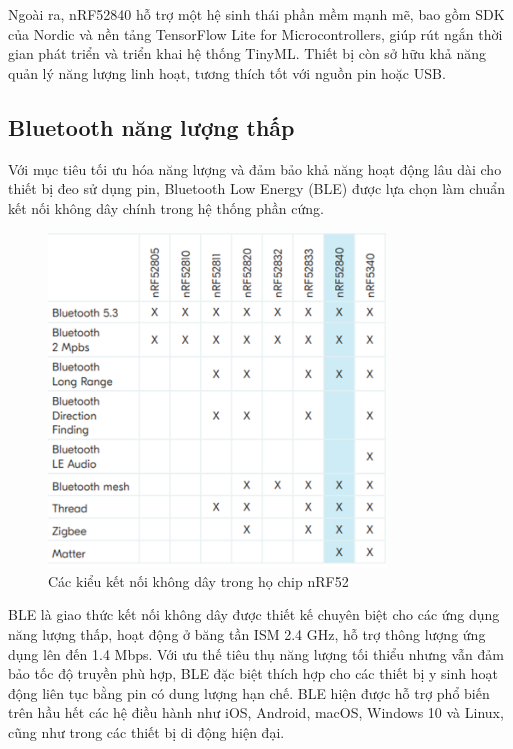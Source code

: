 Ngoài ra, nRF52840 hỗ trợ một hệ sinh thái phần mềm mạnh mẽ, bao gồm SDK 
của Nordic và nền tảng TensorFlow Lite for Microcontrollers, giúp rút 
ngắn thời gian phát triển và triển khai hệ thống TinyML. Thiết bị còn 
sở hữu khả năng quản lý năng lượng linh hoạt, tương thích tốt với nguồn pin hoặc USB. 





\subsection{Bluetooth năng lượng thấp}

Với mục tiêu tối ưu hóa năng lượng và đảm bảo khả năng hoạt động lâu dài 
cho thiết bị đeo sử dụng pin, Bluetooth Low Energy (BLE) được lựa chọn 
làm chuẩn kết nối không dây chính trong hệ thống phần cứng.

\begin{figure}[htbp]
		\centering
 		\includegraphics[width=0.8\textwidth]{images/ble.png}
		\caption{Các kiểu kết nối không dây trong họ chip nRF52}
		\label{ble}
\end{figure}

BLE là giao thức kết nối không dây được thiết kế chuyên biệt cho 
các ứng dụng năng lượng thấp, hoạt động ở băng tần ISM 2.4 GHz, 
hỗ trợ thông lượng ứng dụng lên đến 1.4 Mbps. Với ưu thế tiêu thụ năng 
lượng tối thiểu nhưng vẫn đảm bảo tốc độ truyền phù hợp, BLE đặc biệt 
thích hợp cho các thiết bị y sinh hoạt động liên tục bằng pin có dung 
lượng hạn chế. BLE hiện được hỗ trợ phổ biến trên hầu hết các hệ điều 
hành như iOS, Android, macOS, Windows 10 và Linux, cũng như trong các 
thiết bị di động hiện đại.


